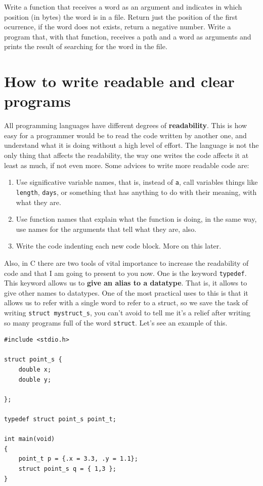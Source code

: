 \documentclass[a4paper]{article}
\begin{document}
\begin{exercises}[resume*]
\item Write a function that receives a word as an argument and indicates
in which position (in bytes) the word is in a file. Return just the position of
the first ocurrence, if the word does not exists, return a negative number.
Write a program that, with that function, receives a path and a word as
arguments and prints the result of searching for the word in the file.
\end{exercises}

\section{How to write readable and clear programs}
All programming languages have different degrees of \textbf{readability}. This
is how easy for a programmer would be to read the code written by another one,
and understand what it is doing without a high level of effort.
The language is not
the only thing that affects the readability, the way one writes the code affects
it at least as much, if not even more. Some advices to write more readable code
are:
\begin{enumerate}
\item Use significative variable names, that is, instead of \verb!a!, call
variables things like \verb!length!, \verb!days!, or something that has anything
to do with their meaning, with what they are.
\item Use function names that explain what the function is doing, in the same
way, use names for the arguments that tell what they are, also.
\item Write the code indenting each new code block. More on this later.
\end{enumerate}

Also, in C there are two tools of vital importance to increase the readability
of code and that I am going to present to you now. One is the keyword
\lstinline[style=C]!typedef!. This keyword allows us to \textbf{give an alias
to a datatype}. That is, it allows to give other names to datatypes. One of the
most practical uses to this is that it allows us to refer with a single word to
refer to a struct, so we save the task of writing \verb!struct mystruct_s!,
you can't avoid to tell me it's a relief after writing so many programs full of
the word \verb!struct!. Let's see an example of this.

\noindent
\begin{minipage}[H]{\linewidth}
\mbox{}
\begin{lstlisting}[style=C,
caption={Definition of a type from a struct},
label={lst:structTypeDefinition}]
#include <stdio.h>

struct point_s {
    double x;
    double y;

};

typedef struct point_s point_t;

int main(void)
{
    point_t p = {.x = 3.3, .y = 1.1};
    struct point_s q = { 1,3 };
}
\end{lstlisting}
\end{minipage}
\end{document}
